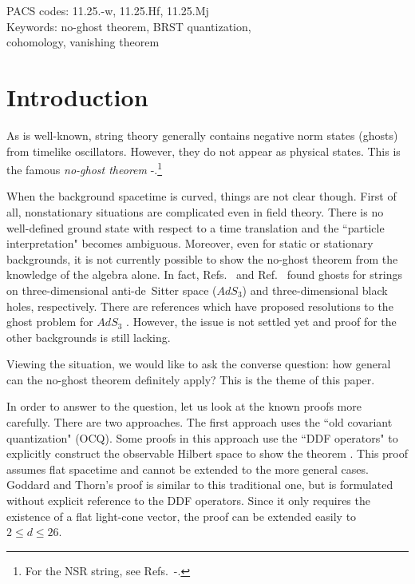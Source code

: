 \documentclass[a4paper,12pt]{article}
\begin{document}
\begin{flushright}
       PACS codes: 11.25.-w, 11.25.Hf, 11.25.Mj\\
       Keywords: no-ghost theorem, BRST quantization,\\
       cohomology, vanishing theorem\\
\end{flushright}

\vfill
\pagebreak

\pagestyle{plain}               %
\setcounter{page}{1}    %

\baselineskip=16pt

\section{Introduction}

As is well-known, string theory generally contains negative norm states
(ghosts) from timelike oscillators. However, they do not appear as physical
states. This is the famous {\it no-ghost theorem}
\cite{ocq1}-\cite{GM}.\footnote{For the NSR string, see
Refs.~\cite{nsr1}-\cite{FK}.}

When the background spacetime is curved, things are not clear though.
First of all, nonstationary situations are complicated even in field
theory. There is no well-defined ground state with respect to a time
translation and the ``particle interpretation" becomes ambiguous. Moreover,
even for static or stationary backgrounds, it is not currently possible to
show the no-ghost theorem from the knowledge of the algebra alone. In fact,
Refs.~\cite{sl2r} and Ref.~\cite{NS} found ghosts for strings on
three-dimensional anti-de~Sitter space ($AdS_3$)
and three-dimensional black holes, 
respectively. There are references which have proposed resolutions to the
ghost problem  for $AdS_3$ \cite{sl2r2,Evans:1998qu}.
However, the issue is not settled yet and proof for the other backgrounds is still lacking.

Viewing the situation, we would like to ask the converse question: how
general can the no-ghost theorem definitely apply? This is the theme of this
paper.

In order to answer to the question, let us look at the known proofs more
carefully. There are two approaches. The first approach uses the ``old
covariant quantization" (OCQ). Some proofs in this approach use the ``DDF
operators" to explicitly construct the observable Hilbert space to show the
theorem \cite{ocq1,nsr1}. This proof assumes flat spacetime and cannot be
extended to the more general cases. Goddard and Thorn's proof
\cite{ocq2,thorn3} is similar to this traditional one, but is formulated
without explicit reference to the DDF operators. Since it only requires the existence of a flat light-cone vector, the proof can be extended easily to $2 \leq d \leq 26$.
\end{document}
